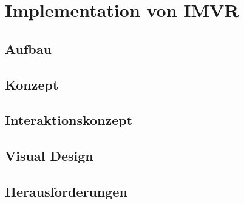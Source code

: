 \chapter{Implementation von IMVR}
\section{Aufbau}
\section{Konzept}
\section{Interaktionskonzept}
\section{Visual Design}
\section{Herausforderungen}